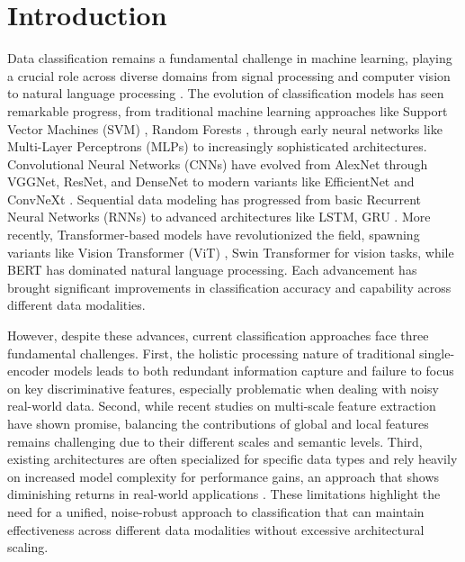 \documentclass[a4paper,fleqn]{cas-sc}
\begin{document}
\maketitle

\section{Introduction}
Data classification remains a fundamental challenge in machine learning, playing a crucial role across diverse domains from signal processing and computer vision to natural language processing  \cite{sarker2021deep,akinci2024machine,joshi2022deep,zhang2022review}. The evolution of classification models has seen remarkable progress, from traditional machine learning approaches like Support Vector Machines (SVM) \cite{cortes1995support}, Random Forests \cite{breiman2001random}, through early neural networks like Multi-Layer Perceptrons (MLPs) \cite{kruse2022multi} to increasingly sophisticated architectures. Convolutional Neural Networks (CNNs) have evolved from AlexNet through VGGNet, ResNet, and DenseNet to modern variants like EfficientNet and ConvNeXt \cite{jo2023convolutional}. Sequential data modeling has progressed from basic Recurrent Neural Networks (RNNs) to advanced architectures like LSTM, GRU \cite{jo2023recurrent}. More recently, Transformer-based models \cite{vaswani2017attention} have revolutionized the field, spawning variants like Vision Transformer (ViT) \cite{dosovitskiy2021an}, Swin Transformer \cite{liu2021swin} for vision tasks, while BERT \cite{devlin2019bert} has dominated natural language processing. Each advancement has brought significant improvements in classification accuracy and capability across different data modalities.

However, despite these advances, current classification approaches face three fundamental challenges. First, the holistic processing nature of traditional single-encoder models leads to both redundant information capture and failure to focus on key discriminative features, especially problematic when dealing with noisy real-world data. Second, while recent studies on multi-scale feature extraction \cite{luo2021apple,dai2025mtmfnet,zhu2024diffusion,gao2025msfm} have shown promise, balancing the contributions of global and local features remains challenging due to their different scales and semantic levels. Third, existing architectures are often specialized for specific data types and rely heavily on increased model complexity for performance gains, an approach that shows diminishing returns in real-world applications \cite{sarker2021deep,akinci2024machine}. These limitations highlight the need for a unified, noise-robust approach to classification that can maintain effectiveness across different data modalities without excessive architectural scaling.
\end{document}
